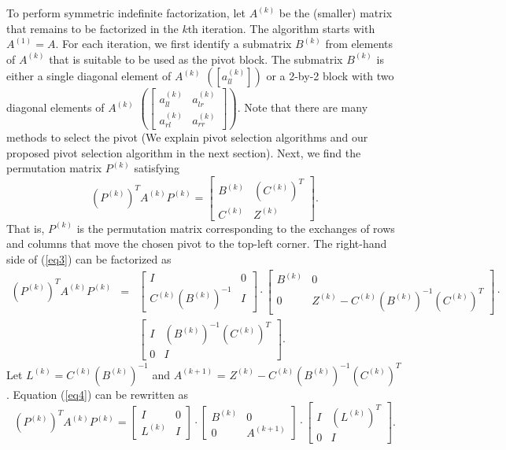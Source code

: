 \documentclass{article}
\begin{document}
To perform symmetric indefinite factorization, let $A^{(k)}$ be the (smaller) matrix that remains to be factorized in the $k$th iteration. The algorithm starts with $A^{(1)}=A$. 
For each iteration, we first identify a submatrix $B^{(k)}$ from elements of $A^{(k)}$ that is suitable to be used as the pivot block.
The submatrix $B^{(k)}$ is either a single diagonal element of $A^{(k)}$  
$\left(\left\lbrack a^{(k)}_{ll} \right\rbrack\right)$
 or a 2-by-2 block with two diagonal elements of $A^{(k)}$  
$\left(\begin{bmatrix} a^{(k)}_{ll}  & a^{(k)}_{lr} \\  a^{(k)}_{rl} & a^{(k)}_{rr}  \end{bmatrix}\right)$. 
Note that there are many methods to select the pivot (We explain pivot selection algorithms and our proposed pivot selection algorithm in the next section).  Next, we find the permutation matrix $P^{(k)}$ satisfying
\begin{equation} \label{eq3}
(P^{(k)})^TA^{(k)}P^{(k)}=\begin{bmatrix} B^{(k)}     & (C^{(k)})^T   \\      C^{(k)}  & Z^{(k)}       \end{bmatrix}.
\end{equation}
That is, $P^{(k)}$ is the permutation matrix corresponding to the exchanges of rows and columns that move the chosen pivot to the top-left corner.  The right-hand side of (\ref{eq3}) can be factorized as
\begin{eqnarray} \label{eq4}
(P^{(k)})^TA^{(k)}P^{(k)}&=&\begin{bmatrix} I  & 0   \\  C^{(k)}(B^{(k)})^{-1}    & I \end{bmatrix}\cdot
\begin{bmatrix} B^{(k)}  & 0   \\      0    & Z^{(k)}-C^{(k)}(B^{(k)})^{-1} (C^{(k)})^T  \end{bmatrix}\cdot\nonumber\\
&&\begin{bmatrix} I  & (B^{(k)})^{-1}(C^{(k)})^T   \\   0     & I  \end{bmatrix}.
\end{eqnarray}
Let $L^{(k)} = C^{(k)}(B^{(k)})^{-1}$ and $A^{(k+1)}$ = $Z^{(k)}-C^{(k)}(B^{(k)})^{-1}(C^{(k)})^T$. Equation (\ref{eq4}) can be rewritten as
\begin{equation} \label{eq5}
(P^{(k)})^TA^{(k)}P^{(k)}=
\begin{bmatrix} I  & 0   \\     L^{(k)}   & I \end{bmatrix}\cdot
\begin{bmatrix} B^{(k)}  & 0   \\      0    & A^{(k+1)} \end{bmatrix}\cdot
\begin{bmatrix} I  &    (L^{(k)})^T \\0& I \end{bmatrix}.
\end{equation}
\end{document}
